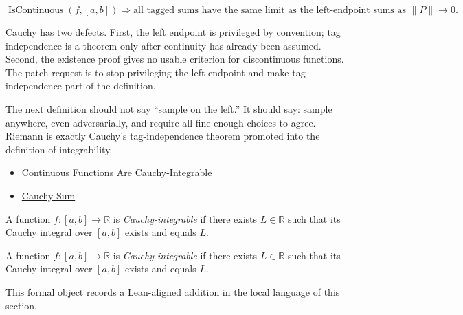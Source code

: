 \begin{remark*}
\[
\operatorname{IsContinuous}(f,[a,b])
\Longrightarrow
\text{all tagged sums have the same limit as the left-endpoint sums as }\|P\|\to0.
\]
\end{remark*}

\begin{remark*}[Interpretation]
Cauchy has two defects. First, the left endpoint is privileged by convention;
tag independence is a theorem only after continuity has already been assumed.
Second, the existence proof gives no usable criterion for discontinuous
functions. The patch request is to stop privileging the left endpoint and make
tag independence part of the definition.


The next definition should not say ``sample on the left.'' It should say:
sample anywhere, even adversarially, and require all fine enough choices to
agree. Riemann is exactly Cauchy's tag-independence theorem promoted into the
definition of integrability.
\end{remark*}

\begin{dependencies}
\begin{itemize}
  \item \hyperref[thm:continuous-cauchy-integrable]{Continuous Functions Are Cauchy-Integrable}
  \item \hyperref[def:cauchy-sum]{Cauchy Sum}
\end{itemize}
\end{dependencies}

\begin{definition}
\label{def:is-cauchy-integrable}
A function $f:[a,b]\to\mathbb R$ is \emph{Cauchy-integrable} if there exists $L\in\mathbb R$ such that its Cauchy integral over $[a,b]$ exists and equals $L$.
\end{definition}

\begin{remark*}
A function $f:[a,b]\to\mathbb R$ is \emph{Cauchy-integrable} if there exists $L\in\mathbb R$ such that its Cauchy integral over $[a,b]$ exists and equals $L$.
\end{remark*}

\begin{remark*}[Interpretation]
This formal object records a Lean-aligned addition in the local language of this section.
\end{remark*}

